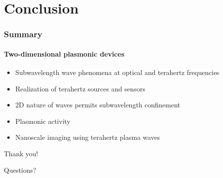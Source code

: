 \documentclass[mathserif,16pt,xcolor=table]{beamer}
\begin{document}
\section{Conclusion}
\begin{frame}
  \frametitle{Summary}
  \framesubtitle{Two-dimensional plasmonic devices}
  \begin{itemize}
    \item Subwavelength wave phenomena at optical and terahertz frequencies
    \item Realization of terahertz sources and sensors
    \item 2D nature of waves permits subwavelength confinement
    \item Plasmonic activity
    \item Nanoscale imaging using terahertz plasma waves
  \end{itemize}
\end{frame}
\begin{frame}[plain,c]
  \begin{center}
    \Huge Thank you!
  \end{center}
\end{frame}
\begin{frame}[plain,c]
  \begin{center}
    \Huge Questions?
  \end{center}
\end{frame}
\end{document}
